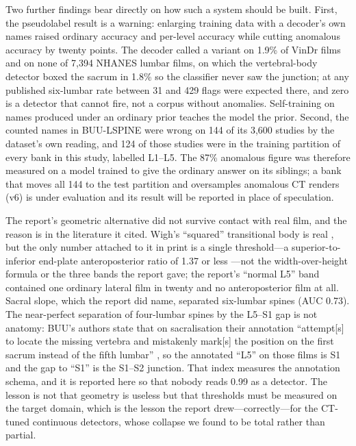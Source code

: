 \documentclass[11pt,letterpaper]{article}
\begin{document}
Two further findings bear directly on how such a system should be built. First, the pseudolabel result is a warning: enlarging training data with a decoder's own names raised ordinary accuracy and per-level accuracy while cutting anomalous accuracy by twenty points. The decoder called a variant on 1.9\% of VinDr films and on none of 7,394 NHANES lumbar films, on which the vertebral-body detector boxed the sacrum in 1.8\% so the classifier never saw the junction; at any published six-lumbar rate between 31 and 429 flags were expected there, and zero is a detector that cannot fire, not a corpus without anomalies. Self-training on names produced under an ordinary prior teaches the model the prior. Second, the counted names in BUU-LSPINE were wrong on 144 of its 3,600 studies by the dataset's own reading, and 124 of those studies were in the training partition of every bank in this study, labelled L1--L5. The 87\% anomalous figure was therefore measured on a model trained to give the ordinary answer on its siblings; a bank that moves all 144 to the test partition and oversamples anomalous CT renders (v6) is under evaluation and its result will be reported in place of speculation.

The report's geometric alternative did not survive contact with real film, and the reason is in the literature it cited. Wigh's ``squared'' transitional body is real \citep{wigh1980,wigh1981}, but the only number attached to it in print is a single threshold---a superior-to-inferior end-plate anteroposterior ratio of 1.37 or less \citep{konin2010}---not the width-over-height formula or the three bands the report gave; the report's ``normal L5'' band contained one ordinary lateral film in twenty and no anteroposterior film at all. Sacral slope, which the report did name, separated six-lumbar spines (AUC 0.73). The near-perfect separation of four-lumbar spines by the L5--S1 gap is not anatomy: BUU's authors state that on sacralisation their annotation ``attempt[s] to locate the missing vertebra and mistakenly mark[s] the position on the first sacrum instead of the fifth lumbar'' \citep{buu2023}, so the annotated ``L5'' on those films is S1 and the gap to ``S1'' is the S1--S2 junction. That index measures the annotation schema, and it is reported here so that nobody reads 0.99 as a detector. The lesson is not that geometry is useless but that thresholds must be measured on the target domain, which is the lesson the report drew---correctly---for the CT-tuned continuous detectors, whose collapse we found to be total rather than partial.
\end{document}
